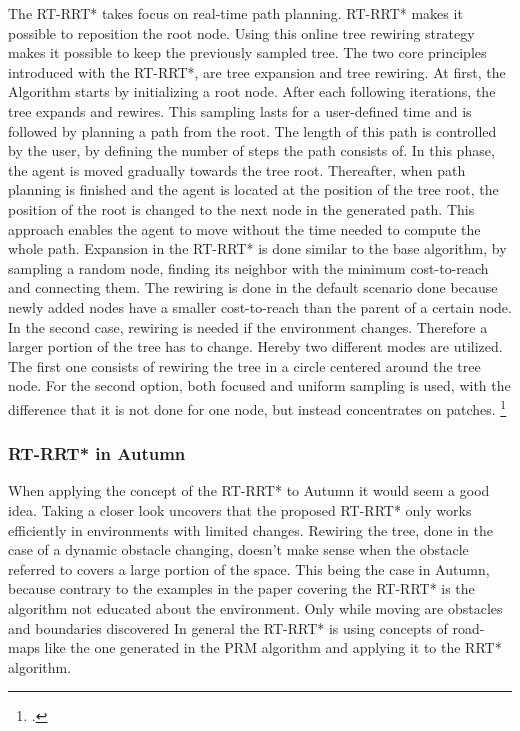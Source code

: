 The RT-RRT* takes focus on real-time path planning. RT-RRT* makes it possible to reposition the root node. Using this online tree rewiring strategy makes it possible to keep the previously sampled tree.
The two core principles introduced with the RT-RRT*, are tree expansion and tree rewiring. 
At first, the Algorithm starts by initializing a root node. After each following iterations, the tree expands and rewires. This sampling lasts for a user-defined time and is followed by planning a path from the root. The length of this path is controlled by the user, by defining the number of steps the path consists of. In this phase, the agent is moved gradually towards the tree root. Thereafter, when path planning is finished and the agent is located at the position of the tree root, the position of the root is changed to the next node in the generated path. This approach enables the agent to move without the time needed to compute the whole path.
Expansion in the RT-RRT* is done similar to the base algorithm, by sampling a random node, finding its neighbor with the minimum cost-to-reach and connecting them.
The rewiring is done in the default scenario done because newly added nodes have a smaller cost-to-reach than the parent of a certain node. In the second case, rewiring is needed if the environment changes. Therefore a larger portion of the tree has to change. Hereby two different modes are utilized. The first one consists of rewiring the tree in a circle centered around the tree node. For the second option, both focused and uniform sampling is used, with the difference that it is not done for one node, but instead concentrates on patches.
\footcite{Naderi2015}

\subsubsection{RT-RRT* in Autumn}

When applying the concept of the RT-RRT* to Autumn it would seem a good idea. Taking a closer look uncovers that the proposed RT-RRT* only works efficiently in environments with limited changes. Rewiring the tree, done in the case of a dynamic obstacle changing, doesn't make sense when the obstacle referred to covers a large portion of the space. This being the case in Autumn, because contrary to the examples in the paper covering the RT-RRT* is the algorithm not educated about the environment. Only while moving are obstacles and boundaries discovered In general the RT-RRT* is using concepts of road-maps like the one generated in the PRM algorithm and applying it to the RRT* algorithm.  

